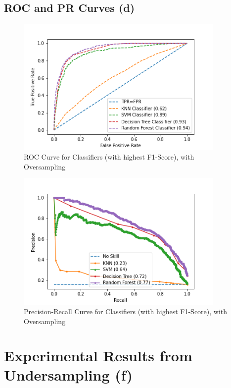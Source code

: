 \documentclass{article}
\begin{document}
\subsection{ROC and PR Curves (d)}

\begin{figure}[H]
\includegraphics[width=0.90\textwidth]{ROCCurve_over}
\caption{ROC Curve for Classifiers (with highest F1-Score), with Oversampling}
\label{fig:rocCurve_over}
\end{figure}

\begin{figure}[H]
\includegraphics[width=0.90\textwidth]{PRCurve_over}
\caption{Precision-Recall Curve for Classifiers (with highest F1-Score), with Oversampling}
\label{fig:prCurve_over}
\end{figure}

\section{Experimental Results from Undersampling (f)}
\end{document}
